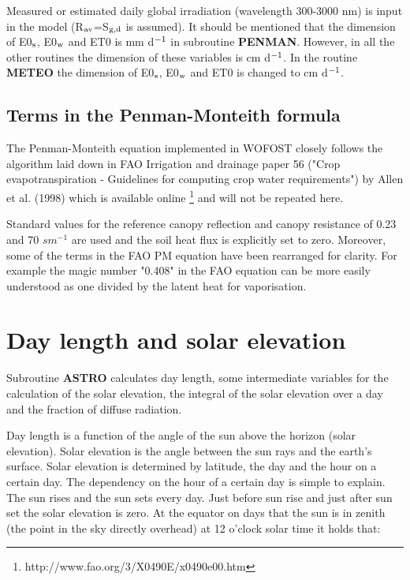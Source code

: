 Measured or estimated daily global irradiation (wavelength 300-3000 nm) is input in the
model (R$_{{\rm av}}$=S$_{{\rm g,d}}$ is assumed). It should be mentioned that the dimension of E0$_{{\rm s}}$, E0$_{{\rm w}}$ and ET0 is mm d$^{{\rm -1}}$ in subroutine {\bf PENMAN}. However, in all the other routines the dimension of these variables is cm d$^{{\rm -1}}$. In the routine {\bf METEO} the dimension of E0$_{{\rm s}}$, E0$_{{\rm w}}$ and ET0 is changed to cm d$^{{\rm -1}}$.


\subsection{Terms in the Penman-Monteith formula}

The Penman-Monteith equation implemented in WOFOST closely follows the algorithm laid down in 
FAO Irrigation and drainage paper 56 ("Crop evapotranspiration - Guidelines for computing crop 
water requirements") by Allen et al. (1998) which is available online \footnote{http://www.fao.org/3/X0490E/x0490e00.htm}
and will not be repeated here.

Standard values for the reference canopy reflection and canopy resistance of 0.23 and 70 $s m^{-1}$ are used and
the soil heat flux is explicitly set to zero. Moreover, some of the terms in the FAO PM equation have been
rearranged for clarity. For example the magic number "0.408" in the FAO equation can be more easily 
understood as one divided by the latent heat for vaporisation.


\section{Day length and solar elevation}
\label{sec:daylength}

Subroutine {\bf ASTRO} calculates day length, some intermediate variables for the calculation
of the solar elevation, the integral of the solar elevation over a day and the fraction of
diffuse radiation.

Day length is a function of the angle of the sun above the horizon (solar elevation). Solar
elevation is the angle between the sun rays and the earth's surface. Solar elevation is
determined by latitude, the day and the hour on a certain day.
The dependency on the hour of a certain day is simple to explain. The sun rises and the
sun sets every day. Just before sun rise and just after sun set the solar elevation is zero. 
At the equator on days that the sun is in zenith (the point in the sky directly overhead) at 
12 o'clock solar time it holds that:

